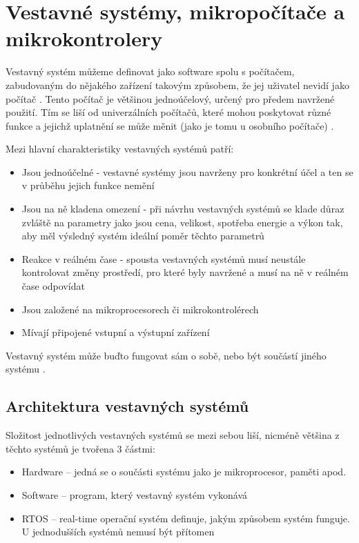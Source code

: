 \section{Vestavné systémy, mikropočítače a mikrokontrolery}

Vestavný systém můžeme definovat jako software spolu s počítačem, zabudovaným do nějakého zařízení takovým způsobem, že jej uživatel nevidí jako počítač \cite{DesigningEmbeddedSystems}. Tento počítač je většinou jednoúčelový, určený pro předem navržené použití. Tím se liší od univerzálních počítačů, které mohou poskytovat různé funkce a jejichž uplatnění se může měnit (jako je tomu u osobního počítače) \cite{EmbeddedSystems}.

Mezi hlavní charakteristiky vestavných systémů patří:
\begin{itemize}
    \item Jsou jednoúčelné - vestavné systémy jsou navrženy pro konkrétní účel a ten se v průběhu jejich funkce nemění
    \item Jsou na ně kladena omezení - při návrhu vestavných systémů se klade důraz zvláště na parametry jako jsou cena, velikost, spotřeba energie a výkon tak, aby měl výsledný systém ideální poměr těchto parametrů
    \item Reakce v reálném čase - spousta vestavných systémů musí neustále kontrolovat změny prostředí, pro které byly navržené a musí na ně v reálném čase odpovídat
    \item Jsou založené na mikroprocesorech či mikrokontrolérech
    \item Mívají připojené vstupní a výstupní zařízení
\end{itemize}
 Vestavný systém může buďto fungovat sám o sobě, nebo být součástí jiného systému \cite{ESOverview}.


\subsection*{Architektura vestavných systémů}
Složitost jednotlivých vestavných systémů se mezi sebou liší, nicméně většina z těchto systémů je tvořena 3 částmi:
\begin{itemize}
    \item Hardware -- jedná se o součásti systému jako je mikroprocesor, paměti apod.
    \item Software -- program, který vestavný systém vykonává
    \item RTOS -- real-time operační systém definuje, jakým způsobem systém funguje. U jednodušších systémů nemusí být přítomen
\end{itemize}

